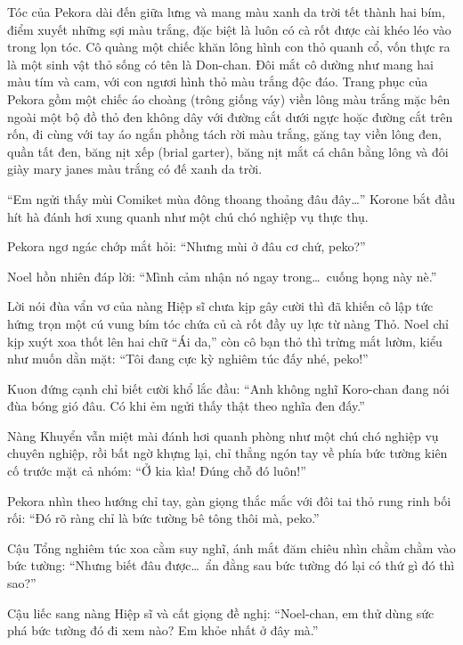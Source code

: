 \documentclass[../main.tex]{subfiles}
\begin{document}
Tóc của Pekora dài đến giữa lưng và mang màu xanh da trời tết thành hai bím, điểm xuyết những sợi màu trắng, đặc biệt là luôn có cà rốt được cài khéo léo vào trong lọn tóc. Cô quàng một chiếc khăn lông hình con thỏ quanh cổ, vốn thực ra là một sinh vật thỏ sống có tên là Don-chan. Đôi mắt cô dường như mang hai màu tím và cam, với con ngươi hình thỏ màu trắng độc đáo. Trang phục của Pekora gồm một chiếc áo choàng (trông giống váy) viền lông màu trắng mặc bên ngoài một bộ đồ thỏ đen không dây với đường cắt dưới ngực hoặc đường cắt trên rốn, đi cùng với tay áo ngắn phồng tách rời màu trắng, găng tay viền lông đen, quần tất đen, băng nịt xếp (brial garter), băng nịt mắt cá chân bằng lông và đôi giày mary janes màu trắng có đế xanh da trời.

\chrint

``Em ngửi thấy mùi Comiket mùa đông thoang thoảng đâu đây\dots'' Korone bắt đầu hít hà đánh hơi xung quanh như một chú chó nghiệp vụ thực thụ.

Pekora ngơ ngác chớp mắt hỏi: ``Nhưng mùi ở đâu cơ chứ, peko?''

Noel hồn nhiên đáp lời: ``Mình cảm nhận nó ngay trong\dots\ cuống họng này nè.''

Lời nói đùa vẩn vơ của nàng Hiệp sĩ chưa kịp gây cười thì đã khiến cô lập tức hứng trọn một cú vung bím tóc chứa củ cà rốt đầy uy lực từ nàng Thỏ. Noel chỉ kịp xuýt xoa thốt lên hai chữ ``Ái da,'' còn cô bạn thỏ thì trừng mắt lườm, kiểu như muốn dằn mặt: ``Tôi đang cực kỳ nghiêm túc đấy nhé, peko!''

Kuon đứng cạnh chỉ biết cười khổ lắc đầu: ``Anh không nghĩ Koro-chan đang nói đùa bóng gió đâu. Có khi ẻm ngửi thấy thật theo nghĩa đen đấy.''

Nàng Khuyển vẫn miệt mài đánh hơi quanh phòng như một chú chó nghiệp vụ chuyên nghiệp, rồi bất ngờ khựng lại, chỉ thẳng ngón tay về phía bức tường kiên cố trước mặt cả nhóm: ``Ở kia kìa! Đúng chỗ đó luôn!''


Pekora nhìn theo hướng chỉ tay, gàn giọng thắc mắc với đôi tai thỏ rung rinh bối rối: ``Đó rõ ràng chỉ là bức tường bê tông thôi mà, peko.''

Cậu Tổng nghiêm túc xoa cằm suy nghĩ, ánh mắt đăm chiêu nhìn chằm chằm vào bức tường: ``Nhưng biết đâu được\dots\ ẩn đằng sau bức tường đó lại có thứ gì đó thì sao?''

Cậu liếc sang nàng Hiệp sĩ và cất giọng đề nghị: ``Noel-chan, em thử dùng sức phá bức tường đó đi xem nào? Em khỏe nhất ở đây mà.''
\end{document}
